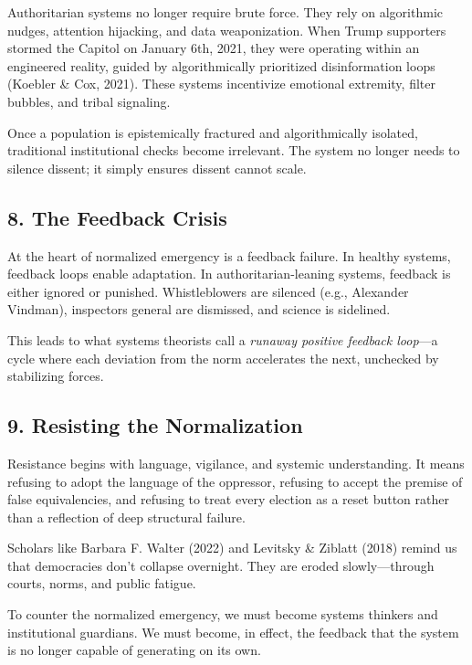 Authoritarian systems no longer require brute force. They rely on
algorithmic nudges, attention hijacking, and data weaponization. When
Trump supporters stormed the Capitol on January 6th, 2021, they were
operating within an engineered reality, guided by algorithmically
prioritized disinformation loops (Koebler \& Cox, 2021). These systems
incentivize emotional extremity, filter bubbles, and tribal signaling.

Once a population is epistemically fractured and algorithmically
isolated, traditional institutional checks become irrelevant. The system
no longer needs to silence dissent; it simply ensures dissent cannot
scale.

\subsection{8. The Feedback Crisis}\label{the-feedback-crisis}

At the heart of normalized emergency is a feedback failure. In healthy
systems, feedback loops enable adaptation. In authoritarian-leaning
systems, feedback is either ignored or punished. Whistleblowers are
silenced (e.g., Alexander Vindman), inspectors general are dismissed,
and science is sidelined.

This leads to what systems theorists call a \emph{runaway positive
feedback loop}---a cycle where each deviation from the norm accelerates
the next, unchecked by stabilizing forces.

\subsection{9. Resisting the
Normalization}\label{resisting-the-normalization}

Resistance begins with language, vigilance, and systemic understanding.
It means refusing to adopt the language of the oppressor, refusing to
accept the premise of false equivalencies, and refusing to treat every
election as a reset button rather than a reflection of deep structural
failure.

Scholars like Barbara F. Walter (2022) and Levitsky \& Ziblatt (2018)
remind us that democracies don't collapse overnight. They are eroded
slowly---through courts, norms, and public fatigue.

To counter the normalized emergency, we must become systems thinkers and
institutional guardians. We must become, in effect, the feedback that
the system is no longer capable of generating on its own.

